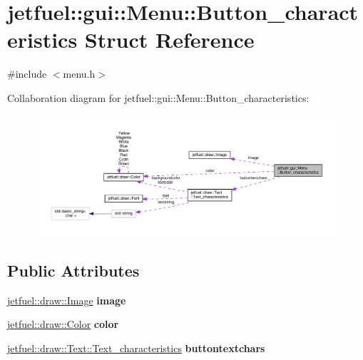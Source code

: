 \hypertarget{structjetfuel_1_1gui_1_1Menu_1_1Button__characteristics}{}\section{jetfuel\+:\+:gui\+:\+:Menu\+:\+:Button\+\_\+characteristics Struct Reference}
\label{structjetfuel_1_1gui_1_1Menu_1_1Button__characteristics}


{\ttfamily \#include $<$menu.\+h$>$}



Collaboration diagram for jetfuel\+:\+:gui\+:\+:Menu\+:\+:Button\+\_\+characteristics\+:
\nopagebreak
\begin{figure}[H]
\begin{center}
\leavevmode
\includegraphics[width=350pt]{structjetfuel_1_1gui_1_1Menu_1_1Button__characteristics__coll__graph}
\end{center}
\end{figure}
\subsection*{Public Attributes}
\begin{DoxyCompactItemize}
\item 
\mbox{\label{structjetfuel_1_1gui_1_1Menu_1_1Button__characteristics_ac808e56f02360af082de0acedaa95328}} 
\hyperlink{classjetfuel_1_1draw_1_1Image}{jetfuel\+::draw\+::\+Image} {\bfseries image}
\item 
\mbox{\label{structjetfuel_1_1gui_1_1Menu_1_1Button__characteristics_a51bce0c5c61b39fb45b6f2267ab9fc17}} 
\hyperlink{classjetfuel_1_1draw_1_1Color}{jetfuel\+::draw\+::\+Color} {\bfseries color}
\item 
\mbox{\label{structjetfuel_1_1gui_1_1Menu_1_1Button__characteristics_a19d5d256fb348fd17efe64d23f9d7023}} 
\hyperlink{structjetfuel_1_1draw_1_1Text_1_1Text__characteristics}{jetfuel\+::draw\+::\+Text\+::\+Text\+\_\+characteristics} {\bfseries buttontextchars}
\end{DoxyCompactItemize}


